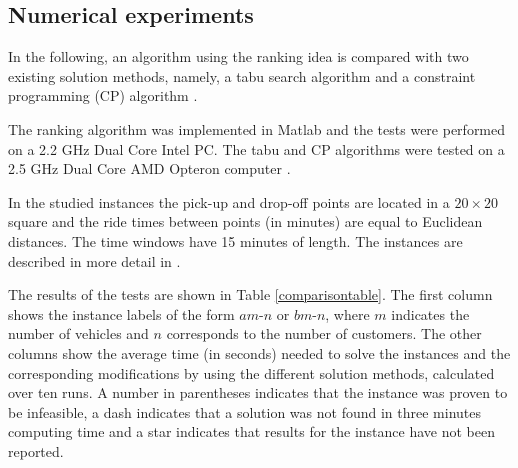 \documentclass[dissertation,draft*]{aaltoseries}
\begin{document}
\subsection{Numerical experiments}
\label{mvexperience}
In the following, an algorithm using the ranking idea is compared with two existing solution methods,
namely, a tabu search algorithm \citep{cordeau02} and
a constraint programming (CP) algorithm \citep{berbegliafeas}. 

The ranking algorithm was implemented in Matlab and the tests were performed on a 2.2 GHz Dual Core Intel PC. 
The tabu and CP algorithms were tested on a 2.5 GHz Dual Core AMD Opteron computer \citep{berbegliathesis}. 

In the studied instances the pick-up and drop-off points are located in a $20 \times 20$ square and the 
ride times between points (in minutes) are equal to Euclidean distances. The time windows
have 15 minutes of length. 
The instances are described in more detail in \citep{cordeau01,ropke2007,berbegliafeas}.

The results of the tests are shown in Table \ref{comparisontable}. The first
column shows the instance labels of the form $am$-$n$ or $bm$-$n$, where $m$
indicates the number of vehicles and $n$ corresponds to the number of customers.
The other columns show the average time (in seconds) needed to solve the
instances and the corresponding modifications by using the different solution methods,
calculated over ten runs. 
A number in parentheses indicates that the instance was proven to be infeasible,
a dash indicates that a solution was not found in three minutes computing time and
a star indicates that results for the instance have not been reported. 
\end{document}
